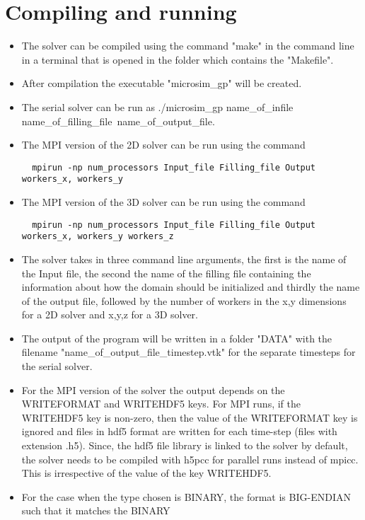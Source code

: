 \documentclass[a4paper,10pt]{article}
\begin{document}
\section{Compiling and running}

\begin{itemize}
 \item The solver can be compiled using the command "make" in the command line in a terminal that is opened in the folder which contains the "Makefile".
 \item After compilation the executable "microsim\_gp" will be created. 
 \item The serial solver can be run as ./microsim\_gp name\_of\_infile name\_of\_filling\_file\ name\_of\_output\_file.
 \item The MPI version of the 2D solver can be run using the command
 \begin{lstlisting}
  mpirun -np num_processors Input_file Filling_file Output workers_x, workers_y
 \end{lstlisting}
 \item The MPI version of the 3D solver can be run using the command
 \begin{lstlisting}
  mpirun -np num_processors Input_file Filling_file Output workers_x, workers_y workers_z
 \end{lstlisting}
 \item The solver takes in three command line arguments, the first is the name of the Input file, 
 the second the name of the filling file containing the information about how the domain 
 should be initialized and thirdly the name of the output file, followed by the number of workers in the 
 x,y dimensions for a 2D solver and x,y,z for a 3D solver. 
 \item The output of the program will be written in a folder "DATA" with the filename 
 "name\_of\_output\_file\_timestep.vtk" for the separate timesteps for the serial solver. 
 \item For the MPI version of the solver the output depends on the WRITEFORMAT and WRITEHDF5 keys.
 For MPI runs, if the WRITEHDF5 key is non-zero, then the value of the WRITEFORMAT key is ignored and files in hdf5 format are written for each time-step
 (files with extension .h5). Since, the hdf5 file library is linked to the solver by default, the solver needs 
 to be compiled with h5pcc for parallel runs instead of mpicc. This is irrespective of the value of the key WRITEHDF5.
 \item For the case when the type chosen is BINARY, the format is BIG-ENDIAN such that it matches the BINARY 

\end{itemize}
\end{document}
